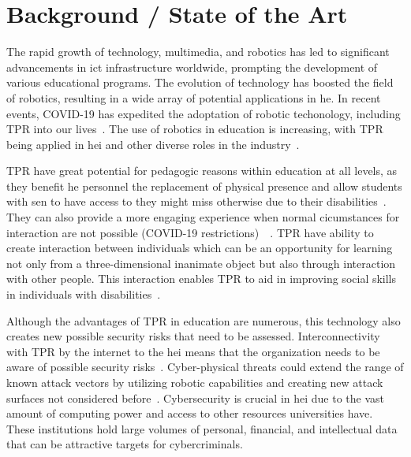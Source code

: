 
\newpage


\section{Background / State of the Art}

The rapid growth of technology, multimedia, and robotics has led to significant advancements in \ac{ict} infrastructure worldwide, prompting
the development of various educational programs. The
evolution
of technology has boosted the field
of robotics,
resulting in a
wide array
of potential applications in \ac{he}. In recent events, COVID-19 has expedited the adoptation of robotic techonology, including \ac{TPR}
into
our lives~\cite[193]{humans_and_robots_relation_2021}. The use of robotics in education is increasing,
with \ac{TPR} being applied in \ac{hei} and other diverse roles in the industry~\cite[]{telepresence_robots_in_classroom_2019,higher_edu_perception_on_tprs_2022}.

\ac{TPR} have great potential for pedagogic reasons within education at all levels, as they benefit \ac{he} personnel the replacement of
physical
presence and allow students with \ac{sen} to have access to  they might miss otherwise due to their disabilities~\cite[546]{
  telepresence_robots_in_classroom_2019}. They can also provide a more engaging experience when normal cicumstances for interaction are not
possible (COVID-19 restrictions)~\cite[197]{humans_and_robots_relation_2021}~\cite[1]{higher_edu_perception_on_tprs_2022}.
\ac{TPR} have ability to create interaction between individuals which can be an opportunity for learning not only from a three-dimensional
inanimate
object but also through interaction with other people. This interaction enables \ac{TPR} to aid in improving social
skills in individuals with disabilities~\cite[541]{telepresence_robots_in_classroom_2019}.

Although the advantages of \ac{TPR} in education are numerous, this technology also creates new possible security risks that need to be
assessed. Interconnectivity with \ac{TPR} by the internet to the \ac{hei} means that the organization needs to be aware of possible
security risks~\cite[120]{robotics_cyber_security_2022}. Cyber-physical threats could extend the range of known attack vectors by
utilizing robotic capabilities and creating new attack surfaces not considered before~\cite[18-19]{analyzing_cyber_physical_threats_2018}.
Cybersecurity
is crucial in \ac{hei} due
to the vast amount
of computing power and access to other resources
universities
have. These institutions hold large volumes of personal, financial, and intellectual data that can be attractive targets for cybercriminals.

